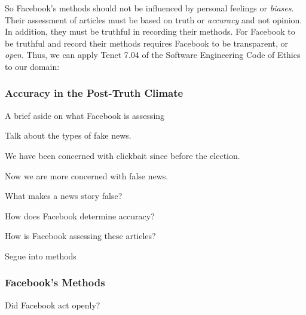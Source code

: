 \par So Facebook's methods should not be influenced by personal feelings or \emph{biases}. Their assessment of articles must be based on truth or \emph{accuracy} and not opinion. In addition, they must be truthful in recording their methods. For Facebook to be truthful and record their methods requires Facebook to be transparent, or \emph{open}. Thus, we can apply Tenet 7.04 of the Software Engineering Code of Ethics to our domain:


\subsubsection{Accuracy in the Post-Truth Climate}

\par A brief aside on what Facebook is assessing


\par Talk about the types of fake news. \cite{ted_becka}

\par We have been concerned with clickbait since before the election.

\par Now we are more concerned with false news.


\par What makes a news story false?

\par How does Facebook determine accuracy? \cite{tc_ban}


\par How is Facebook assessing these articles?

\par Segue into methods

\subsubsection{Facebook's Methods}

\par Did Facebook act openly?

